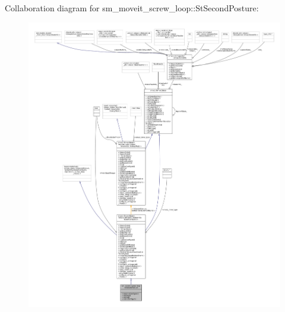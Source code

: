 Collaboration diagram for sm\+\_\+moveit\+\_\+screw\+\_\+loop\+:\+:St\+Second\+Posture\+:
\nopagebreak
\begin{figure}[H]
\begin{center}
\leavevmode
\includegraphics[width=350pt]{structsm__moveit__screw__loop_1_1StSecondPosture__coll__graph}
\end{center}
\end{figure}
